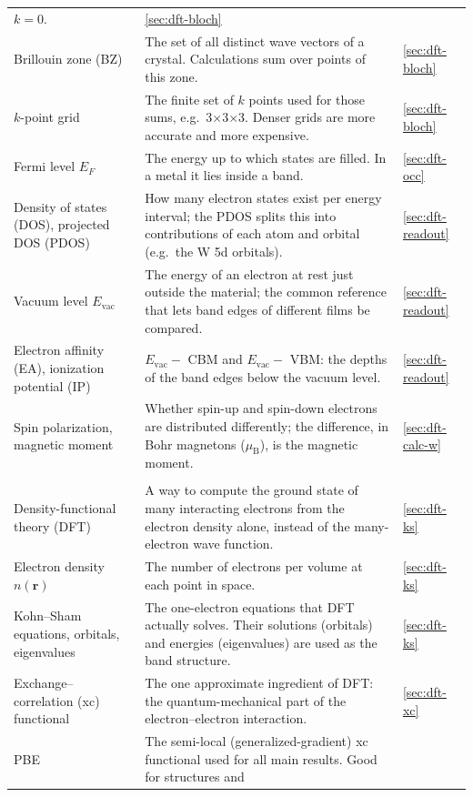 \begin{small}
\begin{longtable}{@{}>{\raggedright\arraybackslash}p{3.3cm}>{\raggedright\arraybackslash}p{9.0cm}>{\raggedright\arraybackslash}p{1.6cm}@{}}
$k = 0$. & \ref{sec:dft-bloch} \\
Brillouin zone (BZ) & The set of all distinct wave vectors of a crystal. Calculations sum over points of this zone. & \ref{sec:dft-bloch} \\
$k$-point grid & The finite set of $k$ points used for those sums, e.g.\ 3$\times$3$\times$3. Denser grids are more
accurate and more expensive. & \ref{sec:dft-bloch} \\
Fermi level $E_F$ & The energy up to which states are filled. In a metal it lies inside a band. & \ref{sec:dft-occ} \\
Density of states (DOS), projected DOS (PDOS) & How many electron states exist per energy interval; the PDOS
splits this into contributions of each atom and orbital (e.g.\ the W 5d orbitals). & \ref{sec:dft-readout} \\
Vacuum level $E_{\mathrm{vac}}$ & The energy of an electron at rest just outside the material; the common reference that
lets band edges of different films be compared. & \ref{sec:dft-readout} \\
Electron affinity (EA), ionization potential (IP) & $E_{\mathrm{vac}} - $ CBM and $E_{\mathrm{vac}} - $ VBM: the depths
of the band edges below the vacuum level. & \ref{sec:dft-readout} \\
Spin polarization, magnetic moment & Whether spin-up and spin-down electrons are distributed differently; the
difference, in Bohr magnetons ($\mu_{\mathrm{B}}$), is the magnetic moment. & \ref{sec:dft-calc-w} \\
\midrule
\multicolumn{3}{@{}l}{\textit{The DFT method}}\\
Density-functional theory (DFT) & A way to compute the ground state of many interacting electrons from the electron
density alone, instead of the many-electron wave function. & \ref{sec:dft-ks} \\
Electron density $n(\mathbf{r})$ & The number of electrons per volume at each point in space. & \ref{sec:dft-ks} \\
Kohn--Sham equations, orbitals, eigenvalues & The one-electron equations that DFT actually solves. Their solutions
(orbitals) and energies (eigenvalues) are used as the band structure. & \ref{sec:dft-ks} \\
Exchange--correlation (xc) functional & The one approximate ingredient of DFT: the quantum-mechanical part of the
electron--electron interaction. & \ref{sec:dft-xc} \\
PBE & The semi-local (generalized-gradient) xc functional used for all main results. Good for structures and

\end{longtable}
\end{small}
